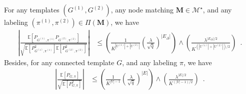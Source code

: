 \documentclass[final]{colt2026}
\newcommand{\1}{\mathbf{1}}
\begin{document}
 \begin{proposition}\label{prop:christophe}
For any templates $(G^{(1)},G^{(2)})$, any node matching $\mathbf{M}\in \mathcal{M}^\star$, and any labeling $(\pi^{(1)},\pi^{(2)})\in \Pi(\mathbf{M})$, we have
\begin{align}\label{eq:christophe1}
\left|\frac{\mathbb{E}\left[P_{G^{(1)}, \pi^{(1)}}P_{G^{(2)}, \pi^{(2)}}\right]}{\sqrt{\mathbb E [P_{G^{(1)}, \pi^{(1)}}^2]\mathbb E [P_{G^{(2)}, \pi^{(2)}}^2]}}\right| & \leq \left(\frac{1}{K^{|U^{(1)}|+ |U^{(2)}|}} \left(\frac{\lambda}{\sqrt{\bar q}}\right)^{|E_{\Delta}|}\right) \land \left(\frac{\lambda^{|E_{\Delta}|/2}}{K^{(|U^{(1)}|+ |U^{(2)}|)/2}} \right)\enspace .
\end{align}
Besides, for any connected template  $G$, and any labeling $\pi$, we have 
\begin{align}
\label{eq:christophe2}
\left|\frac{\mathbb{E}\left[P_{G, \pi}\right]}{\sqrt{\mathbb E [P_{G, \pi}^2]}}\right| & \leq \left(\frac{1}{K^{|V|-1}} \left(\frac{\lambda}{\sqrt{\bar q}}\right)^{|E|}\right) \land \left(\frac{\lambda^{|E|/2}}{K^{(|V|-1)/2}} \right)\enspace . 
\end{align}


 \end{proposition}

\end{document}
